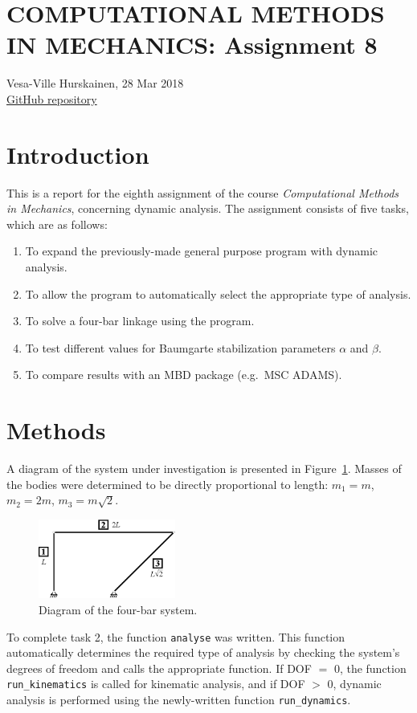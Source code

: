 \documentclass{article}
\begin{document}
\section*{COMPUTATIONAL METHODS IN MECHANICS: Assignment 8}
Vesa-Ville Hurskainen, 28 Mar 2018\\
\href{https://github.com/VesaVilleHurskainen/cmim2018}{GitHub repository}


\section*{Introduction}
This is a report for the eighth assignment of the course \textit{Computational Methods in Mechanics}, concerning dynamic analysis. The assignment consists of five tasks, which are as follows:
\begin{enumerate}
	\setlength\itemsep{0pt}
	\item To expand the previously-made general purpose program with dynamic analysis.
	\item To allow the program to automatically select the appropriate type of analysis.
	\item To solve a four-bar linkage using the program.
	\item To test different values for Baumgarte stabilization parameters $\alpha$ and $\beta$.
	\item To compare results with an MBD package (e.g.~MSC ADAMS).
\end{enumerate}


\section*{Methods}
A diagram of the system under investigation is presented in Figure~\ref*{fig:system}. Masses of the bodies were determined to be directly proportional to length: $m_1 = m$, $m_2 = 2m$, $m_3 = m \sqrt{2}$.
\begin{figure}[htb]
	\centering
	\includegraphics[width=0.4\textwidth]{system.eps}
	\caption{Diagram of the four-bar system.\label{fig:system}}
\end{figure}

To complete task 2, the function \texttt{analyse} was written. This function automatically determines the required type of analysis by checking the system's degrees of freedom and calls the appropriate function. If DOF $=$ 0, the function \texttt{run\_kinematics} is called for kinematic analysis, and if DOF $>$ 0, dynamic analysis is performed using the newly-written function \texttt{run\_dynamics}.
\end{document}
